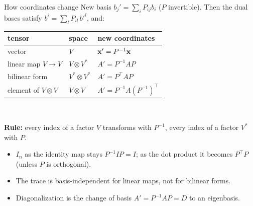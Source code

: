 \documentclass[aspectratio=1610,11pt]{beamer}
\begin{document}

\begin{frame}{How coordinates change}
    \small
    New basis $b_j' = \sum_iP_{ij}b_i$ ($P$ invertible). Then the dual bases satisfy $b^i = \sum_lP_{il}\,b'^l$, and:
    \\[0.3em]
    \centering
    \renewcommand{\arraystretch}{1.3}
    \begin{tabular}{@{}lll@{}}
        \toprule
        tensor & space & new coordinates \\
        \midrule
        vector & $V$ & $\mathbf{x}' = P^{-1}\mathbf{x}$ \\
        linear map $V \to V$ & $V \otimes V^*$ & $A' = P^{-1}AP$ \\
        bilinear form & $V^* \otimes V^*$ & $A' = P^\top AP$ \\
        element of $V \otimes V$ & $V \otimes V$ & $A' = P^{-1}A(P^{-1})^\top$ \\
        \bottomrule
    \end{tabular}
    \\[0.4em]
    \raggedright
    \textbf{Rule:} every index of a factor $V$ transforms with $P^{-1}$, every index of a factor $V^*$ with $P$.
    \begin{itemize}
        \item $I_n$ as the identity map stays $P^{-1}IP = I$; as the dot product it becomes $P^\top P$ (unless $P$ is orthogonal).
        \item The trace is basis-independent for linear maps, not for bilinear forms.
        \item Diagonalization is the change of basis $A' = P^{-1}AP = D$ to an eigenbasis.
    \end{itemize}
\end{frame}

\end{document}

